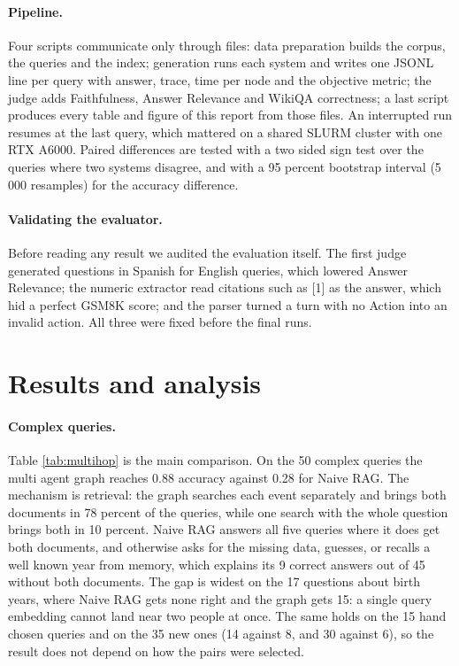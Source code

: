 \documentclass{article}
\begin{document}
\paragraph{Pipeline.}
Four scripts communicate only through files: data preparation builds the corpus, the queries and the index; generation runs each system and writes one JSONL line per query with answer, trace, time per node and the objective metric; the judge adds Faithfulness, Answer Relevance and WikiQA correctness; a last script produces every table and figure of this report from those files. An interrupted run resumes at the last query, which mattered on a shared SLURM cluster with one RTX A6000. Paired differences are tested with a two sided sign test over the queries where two systems disagree, and with a 95 percent bootstrap interval (5\,000 resamples) for the accuracy difference.

\paragraph{Validating the evaluator.}
Before reading any result we audited the evaluation itself. The first judge generated questions in Spanish for English queries, which lowered Answer Relevance; the numeric extractor read citations such as [1] as the answer, which hid a perfect GSM8K score; and the parser turned a turn with no Action into an invalid action. All three were fixed before the final runs.

\section{Results and analysis}



\paragraph{Complex queries.}
Table \ref{tab:multihop} is the main comparison. On the 50 complex queries the multi agent graph reaches 0.88 accuracy against 0.28 for Naive RAG. The mechanism is retrieval: the graph searches each event separately and brings both documents in 78 percent of the queries, while one search with the whole question brings both in 10 percent. Naive RAG answers all five queries where it does get both documents, and otherwise asks for the missing data, guesses, or recalls a well known year from memory, which explains its 9 correct answers out of 45 without both documents. The gap is widest on the 17 questions about birth years, where Naive RAG gets none right and the graph gets 15: a single query embedding cannot land near two people at once. The same holds on the 15 hand chosen queries and on the 35 new ones (14 against 8, and 30 against 6), so the result does not depend on how the pairs were selected.
\end{document}
